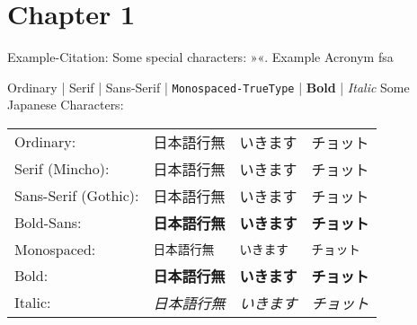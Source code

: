 
\chapter{Chapter 1}
\label{chap:chapter1}

Example-Citation:
\cite{Key_Template_InProceedings_Empty}
\nl%
Some special characters:
»«.
\nl%
Example Acronym
\gls{fsa}

\npi%
Ordinary | \textrm{Serif} | \textsf{Sans-Serif} | \texttt{Monospaced-TrueType} | \textbf{Bold} | \textit{Italic}\nl%
Some Japanese Characters:\nl%
\begin{tabular}{llll}%
Ordinary:&日本語行無&いきます&チョット\\%
Serif (Mincho):&\textrm{日本語行無}&\textrm{いきます}&\textrm{チョット}\\%
Sans-Serif (Gothic):&\textsf{日本語行無}&\textsf{いきます}&\textsf{チョット}\\%
Bold-Sans:&\textbf{\textsf{日本語行無}}&\textbf{\textsf{いきます}}&\textbf{\textsf{チョット}}\\%
Monospaced:&\texttt{日本語行無}&\texttt{いきます}&\texttt{チョット}\\%
Bold:&\textbf{日本語行無}&\textbf{いきます}&\textbf{チョット}\\%
Italic:&\textit{日本語行無}&\textit{いきます}&\textit{チョット}\\%
\end{tabular}%